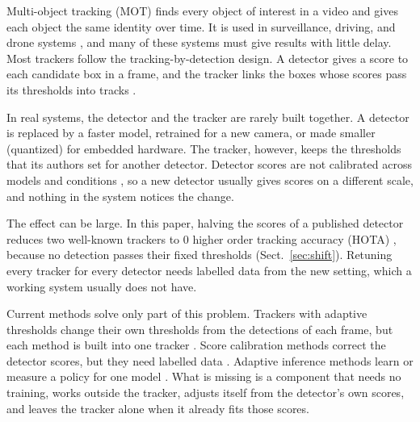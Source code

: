 \documentclass[pdflatex,sn-mathphys-num,iicol]{sn-jnl}
\makeatletter
\def\sectionfont{\reset@font\fontfamily{\rmdefault}\fontsize{11bp}{13bp}\bfseries\selectfont\raggedright\boldmath}
\renewcommand\section{\@startsection{section}{1}{\z@}{-8pt \@plus -2pt \@minus -2pt}{4pt}{\sectionfont}}
\makeatother
\begin{document}
\maketitle

\section{Introduction}\label{sec:intro}

Multi-object tracking (MOT) finds every object of interest in a video and
gives each object the same identity over time. It is used in surveillance,
driving, and drone systems
\cite{zhu2022visdrone,wu2022uavsurvey,lu2024uavdetection}, and many of these
systems must give results with little delay. Most trackers follow the
tracking-by-detection design. A detector gives a score to each candidate box
in a frame, and the tracker links the boxes whose scores pass its thresholds
into tracks \cite{bewley2016sort,zhang2022bytetrack,cao2023ocsort}.

In real systems, the detector and the tracker are rarely built together. A
detector is replaced by a faster model, retrained for a new camera, or made
smaller (quantized) for embedded hardware. The tracker, however, keeps the
thresholds that its authors set for another detector. Detector scores are not
calibrated across models and conditions \cite{kuppers2020detcalib}, so a new
detector usually gives scores on a different scale, and nothing in the system
notices the change.

The effect can be large. In this paper, halving the scores of a published
detector reduces two well-known trackers to 0 higher order tracking accuracy
(HOTA) \cite{luiten2021hota}, because no detection passes their fixed
thresholds (Sect.~\ref{sec:shift}). Retuning every tracker for every detector
needs labelled data from the new setting, which a working system usually does
not have.

Current methods solve only part of this problem. Trackers with adaptive
thresholds change their own thresholds from the detections of each frame, but
each method is built into one tracker
\cite{ma2023adaptivebytetrack,shim2024adaptrack,act2026adaptive}. Score
calibration methods correct the detector scores, but they need labelled data
\cite{kuppers2020detcalib}. Adaptive inference methods learn or measure a
policy for one model \cite{han2022dynamic,jiang2018chameleon}. What is missing
is a component that needs no training, works outside the tracker, adjusts itself
from the detector's own scores, and leaves the tracker alone when it already
fits those scores.
\end{document}
